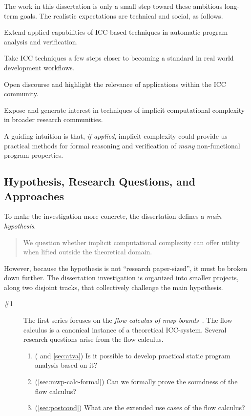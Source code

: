 The work in this dissertation is only a small step toward these ambitious long-term goals.
The realistic expectations are technical and social, as follows.
\begin{enumerate*}
\item Extend {applied} capabilities of ICC-based techniques in automatic program analysis and verification.
\item Take ICC techniques a few steps closer to becoming a standard in real world development workflows.
\item Open discourse and highlight the relevance of applications within the ICC community.
\item Expose and generate interest in techniques of implicit computational complexity in broader research communities.
\end{enumerate*}
A guiding intuition is that, \emph{if applied}, implicit complexity could provide us practical methods for formal reasoning and verification of \emph{many} non-functional program properties.

\subsection{Hypothesis, Research Questions, and Approaches}
\label{subsec:research-goals}

To make the investigation more concrete, the dissertation defines a \emph{main hypothesis}.
\begin{quotation}
\noindent We question whether implicit computational complexity can offer utility when lifted outside the theoretical domain.
\end{quotation}
However, because the hypothesis is not \enquote{research paper-sized}, it must be broken down further.
The dissertation investigation is organized into smaller projects, along two disjoint tracks, that collectively challenge the main hypothesis.

\begin{description}
\item[\#1]
    The first series focuses on the \emph{flow calculus of mwp-bounds}~\cite{jones2009}.
    The flow calculus is a canonical instance of a theoretical ICC-system.
    Several research questions arise from the flow calculus.
    \begin{enumerate}
    \item ( and \autoref{sec:atva}) Is it possible to develop practical static program analysis based on it?
    \item (\autoref{sec:mwp-calc-formal}) Can we formally prove the soundness of the flow calculus?
    \item (\autoref{sec:postcond}) What are the extended use cases of the flow calculus?
    \end{enumerate}
\end{description}

